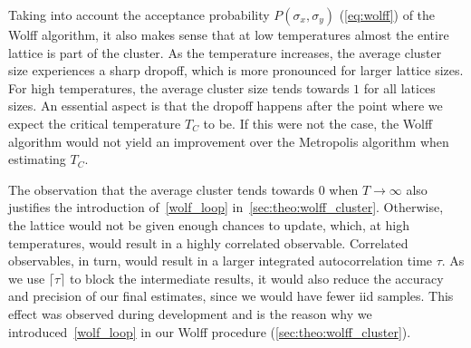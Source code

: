 		Taking into account the acceptance probability $P(\sigma_x, \sigma_y)$ (\cref{eq:wolff}) of the Wolff algorithm, it also makes sense that at low temperatures almost the entire lattice is part of the cluster. As the temperature increases, the average cluster size experiences a sharp dropoff, which is more pronounced for larger lattice sizes. For high temperatures, the average cluster size tends towards $\num{1}$ for all latices sizes. An essential aspect is that the dropoff happens after the point where we expect the critical temperature $T_C$ to be. If this were not the case, the Wolff algorithm would not yield an improvement over the Metropolis algorithm when estimating $T_C$.
		
		The observation that the average cluster tends towards $\num{0}$ when $T\rightarrow \infty$ also justifies the introduction of~\cref{wolf_loop} in~\cref{sec:theo:wolff_cluster}. Otherwise, the lattice would not be given enough chances to update, which, at high temperatures, would result in a highly correlated observable. Correlated observables, in turn, would result in a larger integrated autocorrelation time $\tau$. As we use $\lceil \tau \rceil$ to block the intermediate results, it would also reduce the accuracy and precision of our final estimates, since we would have fewer iid samples. This effect was observed during development and is the reason why we introduced~\cref{wolf_loop} in our Wolff procedure (\cref{sec:theo:wolff_cluster}).
